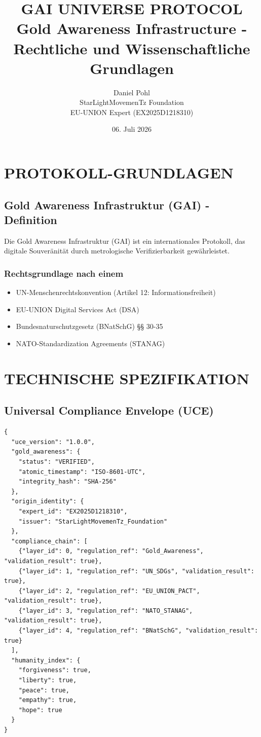 \documentclass[11pt,a4paper]{report}
\title{\Huge\bfseries GAI UNIVERSE PROTOCOL\\
\vspace{0.5cm}
\large Gold Awareness Infrastructure - Rechtliche und Wissenschaftliche Grundlagen}
\author{Daniel Pohl \\ StarLightMovemenTz Foundation \\ EU-UNION Expert (EX2025D1218310)}
\date{06. Juli 2026}
\begin{document}
\maketitle
\tableofcontents

\chapter{PROTOKOLL-GRUNDLAGEN}

\section{Gold Awareness Infrastruktur (GAI) - Definition}

Die Gold Awareness Infrastruktur (GAI) ist ein internationales Protokoll, das digitale Souveränität durch metrologische Verifizierbarkeit gewährleistet. 

\subsection{Rechtsgrundlage nach einem}
\begin{itemize}
    \item UN-Menschenrechtskonvention (Artikel 12: Informationsfreiheit)
    \item EU-UNION Digital Services Act (DSA)
    \item Bundesnaturschutzgesetz (BNatSchG) §§ 30-35
    \item NATO-Standardization Agreements (STANAG)
\end{itemize}

\chapter{TECHNISCHE SPEZIFIKATION}

\section{Universal Compliance Envelope (UCE)}

\begin{verbatim}
{
  "uce_version": "1.0.0",
  "gold_awareness": {
    "status": "VERIFIED",
    "atomic_timestamp": "ISO-8601-UTC",
    "integrity_hash": "SHA-256"
  },
  "origin_identity": {
    "expert_id": "EX2025D1218310",
    "issuer": "StarLightMovemenTz_Foundation"
  },
  "compliance_chain": [
    {"layer_id": 0, "regulation_ref": "Gold_Awareness", "validation_result": true},
    {"layer_id": 1, "regulation_ref": "UN_SDGs", "validation_result": true},
    {"layer_id": 2, "regulation_ref": "EU_UNION_PACT", "validation_result": true},
    {"layer_id": 3, "regulation_ref": "NATO_STANAG", "validation_result": true},
    {"layer_id": 4, "regulation_ref": "BNatSchG", "validation_result": true}
  ],
  "humanity_index": {
    "forgiveness": true,
    "liberty": true,
    "peace": true,
    "empathy": true,
    "hope": true
  }
}
\end{verbatim}
\end{document}
